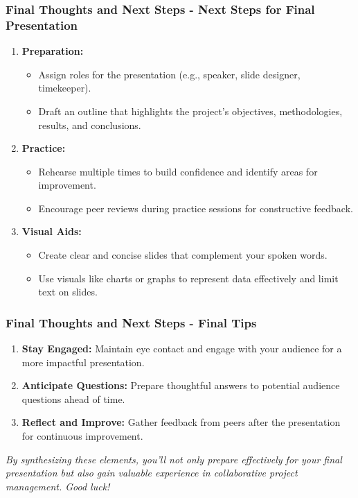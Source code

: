 \documentclass[aspectratio=169]{beamer}
\begin{document}
\begin{frame}[fragile]
    \frametitle{Final Thoughts and Next Steps - Next Steps for Final Presentation}
    
    \begin{enumerate}
        \item \textbf{Preparation:}
        \begin{itemize}
            \item Assign roles for the presentation (e.g., speaker, slide designer, timekeeper).
            \item Draft an outline that highlights the project’s objectives, methodologies, results, and conclusions.
        \end{itemize}
        
        \item \textbf{Practice:}
        \begin{itemize}
            \item Rehearse multiple times to build confidence and identify areas for improvement.
            \item Encourage peer reviews during practice sessions for constructive feedback.
        \end{itemize}
        
        \item \textbf{Visual Aids:}
        \begin{itemize}
            \item Create clear and concise slides that complement your spoken words.
            \item Use visuals like charts or graphs to represent data effectively and limit text on slides.
        \end{itemize}
    \end{enumerate}
\end{frame}

\begin{frame}[fragile]
    \frametitle{Final Thoughts and Next Steps - Final Tips}
    
    \begin{enumerate}
        \item \textbf{Stay Engaged:} Maintain eye contact and engage with your audience for a more impactful presentation.
        \item \textbf{Anticipate Questions:} Prepare thoughtful answers to potential audience questions ahead of time.
        \item \textbf{Reflect and Improve:} Gather feedback from peers after the presentation for continuous improvement.
    \end{enumerate}
    
    \vspace{0.5cm}
    \textit{By synthesizing these elements, you'll not only prepare effectively for your final presentation but also gain valuable experience in collaborative project management. Good luck!}
\end{frame}
\end{document}
